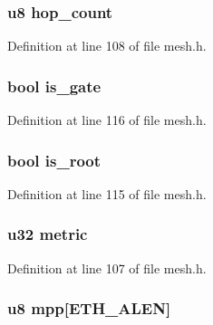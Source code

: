 \hypertarget{structmesh__path_a65c900d253cc9afe77e2aa7a5c3ded5a}{
\subsubsection[{hop\-\_\-count}]{\setlength{\rightskip}{0pt plus 5cm}u8 hop\-\_\-count}}\label{structmesh__path_a65c900d253cc9afe77e2aa7a5c3ded5a}


Definition at line 108 of file mesh.\-h.

\hypertarget{structmesh__path_a4399b726e2ce468eb33d179378d68e21}{
\subsubsection[{is\-\_\-gate}]{\setlength{\rightskip}{0pt plus 5cm}bool is\-\_\-gate}}\label{structmesh__path_a4399b726e2ce468eb33d179378d68e21}


Definition at line 116 of file mesh.\-h.

\hypertarget{structmesh__path_a860e4167ebf87a0635c678a614b96a99}{
\subsubsection[{is\-\_\-root}]{\setlength{\rightskip}{0pt plus 5cm}bool is\-\_\-root}}\label{structmesh__path_a860e4167ebf87a0635c678a614b96a99}


Definition at line 115 of file mesh.\-h.

\hypertarget{structmesh__path_aecb5673e0ccbdfd6e104e917abc4bdfe}{
\subsubsection[{metric}]{\setlength{\rightskip}{0pt plus 5cm}u32 metric}}\label{structmesh__path_aecb5673e0ccbdfd6e104e917abc4bdfe}


Definition at line 107 of file mesh.\-h.

\hypertarget{structmesh__path_a48b50421cfec4f69ffc3b753f7019185}{
\subsubsection[{mpp}]{\setlength{\rightskip}{0pt plus 5cm}u8 mpp\mbox{[}E\-T\-H\-\_\-\-A\-L\-E\-N\mbox{]}}}\label{structmesh__path_a48b50421cfec4f69ffc3b753f7019185}



